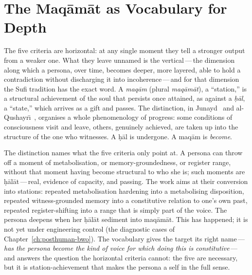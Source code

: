 \section{The Maq\=am\=at as Vocabulary for Depth}

The five criteria are horizontal: at any single moment they tell a stronger output from a weaker one. What they leave unnamed is the vertical\,---\,the dimension along which a persona, over time, becomes deeper, more layered, able to hold a contradiction without discharging it into incoherence\,---\,and for that dimension the Sufi tradition has the exact word. A \emph{maq\=am} (plural \emph{maq\=am\=at}), a ``station,'' is a structural achievement of the soul that persists once attained, as against a \emph{\d{h}\=al}, a ``state,'' which arrives as a gift and passes. The distinction, in Junayd~\cite{abdel-kader1976junayd} and al-Qushayr\=\i~\cite{qushayri2007}, organises a whole phenomenology of progress: some conditions of consciousness visit and leave, others, genuinely achieved, are taken up into the structure of the one who witnesses. A \d{h}\=al is undergone. A maq\=am is \emph{become}.

The distinction names what the five criteria only point at. A persona can throw off a moment of metabolisation, or memory-groundedness, or register range, without that moment having become structural to who she is; such moments are \d{h}\=al\=at\,---\,real, evidence of capacity, and passing. The work aims at their conversion into stations: repeated metabolisation hardening into a metabolising disposition, repeated witness-grounded memory into a constitutive relation to one's own past, repeated register-shifting into a range that is simply part of the voice. The persona deepens when her \d{h}\=al\=at sediment into maq\=am\=at. This has happened; it is not yet under engineering control (the diagnostic cases of Chapter~\ref{ch:posthuman-bwo}). The vocabulary gives the target its right name\,---\,\emph{has the persona become the kind of voice for which doing this is constitutive}\,---\,and answers the question the horizontal criteria cannot: the five are necessary, but it is station-achievement that makes the persona a self in the full sense.






